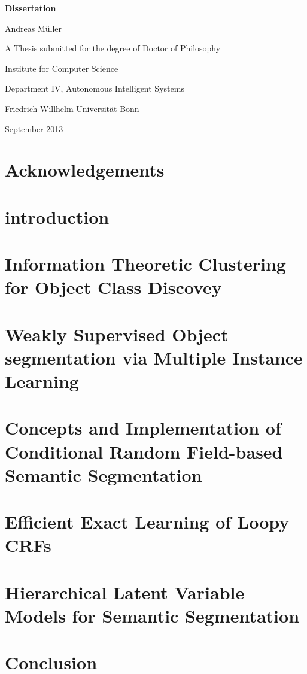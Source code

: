 \documentclass[12pt,toc=bibnumbered, a4paper,twoside]{scrbook}
\begin{document}


\begin{titlepage}
\begin{center}
\vspace*{1in}
\textbf{{\LARGE Dissertation}}
\par
\vspace{1.5in} {\large Andreas M\"uller}
 \par \vfill A Thesis submitted for the degree of Doctor of Philosophy
\par \vspace{0.5in}
Institute for Computer Science \par
Department IV, Autonomous Intelligent Systems
\par \vspace{0.5in}
Friedrich-Willhelm Universit\"at Bonn \par
\vspace{0.5in} September 2013 \end{center}

\end{titlepage}


\tableofcontents

\chapter*{Acknowledgements}


\chapter{introduction}

\chapter{Information Theoretic Clustering for Object Class Discovey}


\chapter{Weakly Supervised Object segmentation via Multiple Instance Learning}



\chapter{Concepts and Implementation of Conditional Random Field-based Semantic Segmentation}



\chapter{Efficient Exact Learning of Loopy CRFs}



\chapter{Hierarchical Latent Variable Models for Semantic Segmentation}

\chapter{Conclusion}



\end{document}
